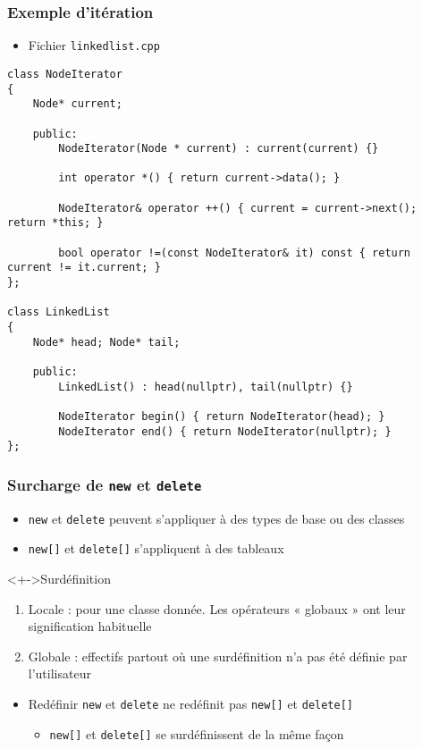 \begin{frame}[containsverbatim]
\frametitle{Exemple d'itération}
\begin{itemize}
\item Fichier \texttt{linkedlist.cpp}
\end{itemize}
\begin{lstlisting}
class NodeIterator
{
	Node* current;

	public:
		NodeIterator(Node * current) : current(current) {}

		int operator *() { return current->data(); }

		NodeIterator& operator ++() { current = current->next(); return *this; }

		bool operator !=(const NodeIterator& it) const { return current != it.current; }
};

class LinkedList
{
	Node* head; Node* tail;
	
	public:
		LinkedList() : head(nullptr), tail(nullptr) {}

		NodeIterator begin() { return NodeIterator(head); }
		NodeIterator end() { return NodeIterator(nullptr); }
};
\end{lstlisting}
\end{frame}

\begin{frame}
\frametitle{Surcharge de \texttt{new} et \texttt{delete}}
\begin{itemize}[<+->]
\item \lstinline|new| et \lstinline|delete| peuvent s'appliquer à des types de base ou des classes
\item \lstinline|new[]| et \lstinline|delete[]| s'appliquent à des tableaux
\end{itemize}
\begin{exampleblock}<+->{Surdéfinition}
	\begin{enumerate}[<+->]
	\item Locale : pour une classe donnée. Les opérateurs « globaux » ont leur signification habituelle
	\item Globale : effectifs partout où une surdéfinition n'a pas été définie par l'utilisateur
	\end{enumerate}
\end{exampleblock}
\begin{itemize}[<+->]
\item Redéfinir \lstinline|new| et \lstinline|delete| ne redéfinit pas \lstinline|new[]| et \lstinline|delete[]|
	\begin{itemize}
	\item \lstinline|new[]| et \lstinline|delete[]| se surdéfinissent de la même façon
	\end{itemize}
\end{itemize}
\end{frame}

